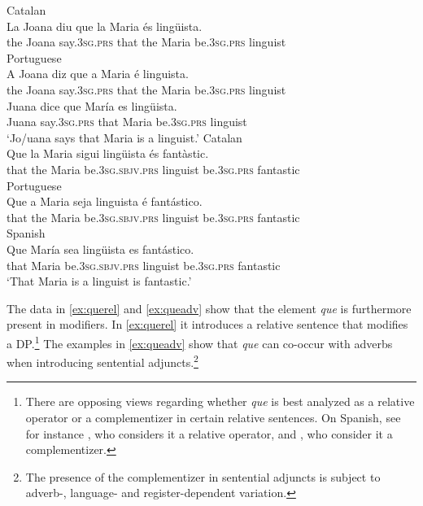 \ea\label{ex:queobj}
\ea\label{ex:queobjcat}
Catalan\\
\gll La Joana diu que la Maria és lingüista. \\
the Joana say.\textsc{3sg.prs} that the Maria be.\textsc{3sg.prs} linguist\\
\ex\label{ex:queobjpt} Portuguese\\
\gll A Joana diz que a Maria é linguista. \\
the Joana say.\textsc{3sg.prs} that the Maria be.\textsc{3sg.prs} linguist\\
\ex\label{ex:queobjes}
\gll Juana dice que María es lingüista. \\
Juana say.\textsc{3sg.prs} that  Maria be.\textsc{3sg.prs} linguist\\
\glt`Jo/uana says that Maria is a linguist.'
\z
\ex
\label{ex:quesubj}
\ea\label{ex:quesubjcat}
Catalan\\
\gll Que la Maria sigui lingüista és fantàstic. \\
that the Maria be\textsc{.3sg.sbjv.prs} linguist be.\textsc{3sg.prs} fantastic\\
\ex\label{ex:quesubjpt}
Portuguese\\
\gll Que a Maria seja linguista é fantástico. \\
that the Maria be\textsc{.3sg.sbjv.prs} linguist be.\textsc{3sg.prs} fantastic\\

\ex\label{ex:quesubjes}
Spanish\\
\gll Que María sea lingüista es fantástico. \\
that  Maria be.\textsc{3sg.sbjv.prs} linguist be.\textsc{3sg.prs} fantastic\\
\glt`That Maria is a linguist is fantastic.'
\z
\z


The data in \eqref{ex:querel} and \eqref{ex:queadv} show that the element \emph{que} is furthermore present in modifiers. In \eqref{ex:querel} it introduces a relative sentence that modifies a DP.\footnote{There are opposing views regarding whether \emph{que} is best analyzed as a relative operator  or a complementizer  in certain relative sentences. On Spanish, see for instance \citet{Rivero1982}, who considers it a relative operator, and  \citet{Arregi1998}, \citet{Brucart1992} who consider it a complementizer.} The examples in \eqref{ex:queadv} show that \emph{que} can co-occur with adverbs when introducing sentential adjuncts.\footnote{The presence of the complementizer  in sentential adjuncts is subject to adverb-, language- and register-dependent variation. } 


